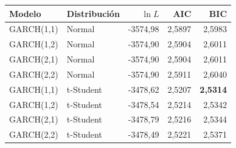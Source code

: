 \begin{tabular}{llrrr}
\toprule
Modelo & Distribución & $\ln L$ & AIC & BIC \\
\midrule
GARCH(1,1) & Normal & -3574{,}98 & 2{,}5897 & 2{,}5983 \\
GARCH(1,2) & Normal & -3574{,}90 & 2{,}5904 & 2{,}6011 \\
GARCH(2,1) & Normal & -3574{,}90 & 2{,}5904 & 2{,}6011 \\
GARCH(2,2) & Normal & -3574{,}90 & 2{,}5911 & 2{,}6040 \\
\midrule
GARCH(1,1) & t-Student & -3478{,}62 & 2{,}5207 & \textbf{2{,}5314} \\
GARCH(1,2) & t-Student & -3478{,}54 & 2{,}5214 & 2{,}5342 \\
GARCH(2,1) & t-Student & -3478{,}79 & 2{,}5216 & 2{,}5344 \\
GARCH(2,2) & t-Student & -3478{,}49 & 2{,}5221 & 2{,}5371 \\
\bottomrule
\end{tabular}
